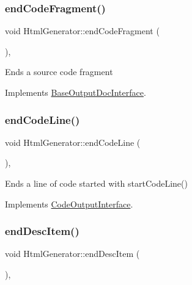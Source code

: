 \subsubsection{\texorpdfstring{endCodeFragment()}{endCodeFragment()}}
{\footnotesize\ttfamily void Html\+Generator\+::end\+Code\+Fragment (\begin{DoxyParamCaption}{ }\end{DoxyParamCaption})\hspace{0.3cm}{\ttfamily [inline]}, {\ttfamily [virtual]}}

Ends a source code fragment 

Implements \mbox{\hyperlink{class_base_output_doc_interface_a08f032482a8f23ac1aab66552db43a81}{Base\+Output\+Doc\+Interface}}.

\mbox{\label{class_html_generator_a509e9b78f035f58e533cef4f79bf5401}} 
\subsubsection{\texorpdfstring{endCodeLine()}{endCodeLine()}}
{\footnotesize\ttfamily void Html\+Generator\+::end\+Code\+Line (\begin{DoxyParamCaption}{ }\end{DoxyParamCaption})\hspace{0.3cm}{\ttfamily [inline]}, {\ttfamily [virtual]}}

Ends a line of code started with start\+Code\+Line() 

Implements \mbox{\hyperlink{class_code_output_interface_afac5763eafc78f93b82691fb9a6dcff7}{Code\+Output\+Interface}}.

\mbox{\label{class_html_generator_a0354681e6d39ae7da41d33f88656e335}} 
\subsubsection{\texorpdfstring{endDescItem()}{endDescItem()}}
{\footnotesize\ttfamily void Html\+Generator\+::end\+Desc\+Item (\begin{DoxyParamCaption}{ }\end{DoxyParamCaption})\hspace{0.3cm}{\ttfamily [inline]}, {\ttfamily [virtual]}}

